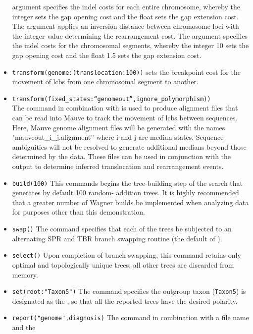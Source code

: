 \begin{itemize}
argument  specifies the indel costs for each entire chromosome, whereby the 
integer sets the gap opening cost and the float sets the gap extension cost.  The argument  applies an inversion distance between chromosome loci with the integer value determining the rearrangement 
cost. The argument  specifies the indel costs for the chromosomal segments, 
whereby the integer 10 sets the gap opening cost and the float 1.5 sets the gap extension cost.
\item \texttt{transform(genome:(translocation:100))} sets the breakpoint cost for the movement of lcbs from one 
chromosomal segment to another. 
\item \texttt{transform(fixed\_states:``genomeout'',ignore\_polymorphism))}  \\The {} command 
in combination with  is used to produce alignment files that 
can be read into Mauve to track the movement of lcbs between sequences. Here, Mauve genome alignment files will be generated 
with the names "mauveout\_i\_j.alignment'' where i and j are median states. Sequence ambiguities will not be resolved to generate additional 
medians beyond those determined by the data. These files can be used in conjunction with the  output to
determine inferred translocation and rearrangement events. 
\item \texttt{build(100)} This commands begins the tree-building step of the search that generates by default 100 random-
addition trees.  It is highly recommended that a greater number of Wagner builds be implemented when analyzing 
data for purposes other than this demonstration.
\item \texttt{swap()} The  command specifies that each of the trees be subjected to an alternating 
SPR and TBR branch swapping routine (the default of \poy).
\item \texttt{select()} Upon completion of branch swapping, this command retains only optimal and topologically 
unique trees; all other trees are discarded from memory.
\item \texttt{set(root:"Taxon5")} The  command specifies the outgroup taxon (\texttt{Taxon5}) 
is designated as the , so that all the reported trees have the desired polarity.
\item \texttt{report("genome",diagnosis)}  The  command in combination with a file name and the

\end{itemize}
